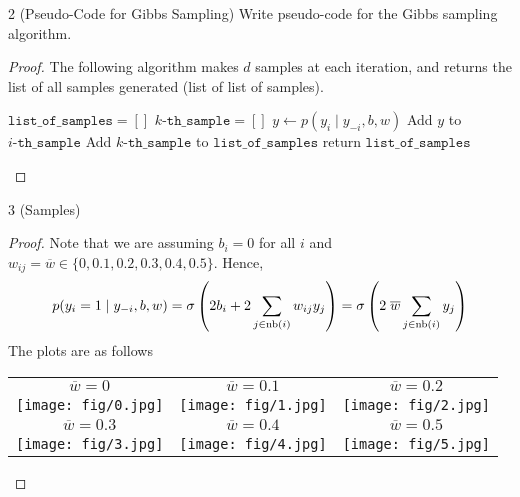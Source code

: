\documentclass[12pt]{article}
\begin{document}
\begin{problem}{2 (Pseudo-Code for Gibbs Sampling)} Write pseudo-code for the Gibbs sampling algorithm.
\end{problem}

\begin{proof} The following algorithm makes $d$ samples at each iteration, and returns the list of all samples generated (list of list of samples).  
\begin{algorithm}[htp!]
\SetAlgoLined
{}
$\texttt{list\_of\_samples} = []$\;
{
    $k\texttt{-th\_sample} = []$\;
    {
        $y \leftarrow p(y_i \mid y_{-i}, b, w)$\;
        Add $y$ to $i\texttt{-th\_sample}$\;
    }
    Add $k  \texttt{-th\_sample}$ to $\texttt{list\_of\_samples}$\;
}
{
    return $\texttt{list\_of\_samples}$\;
}
\caption{$\texttt{Gibbs\_Sampling}$($\texttt{num\_iterations}, b, w$)}
\label{alg:gibbssampling}
\end{algorithm}
\end{proof}

\newpage

\begin{problem}{3 (Samples)}

\end{problem}

\begin{proof}
Note that we are assuming $b_i = 0$ for all $i$ and $w_{ij} = \overline{w} \in \{ 0, 0.1, 0.2, 0.3, 0.4, 0.5 \}$. Hence,
\begin{align}
    p(y_i=1 \mid y_{-i}, b, w) = \sigma\left( 2b_i + 2 \sum_{j \in \mathrm{nb}(i)} w_{ij} y_j \right) = \sigma\left(2 \; \overline{w} \sum_{j \in \mathrm{nb}(i)} y_j\right)
    \label{eq:problem3}
\end{align}
The plots are as follows
\newcommand{\wzero}{\texttt{[image: fig/0.jpg]}}
\newcommand{\wone}{\texttt{[image: fig/1.jpg]}}
\newcommand{\wtwo}{\texttt{[image: fig/2.jpg]}}
\newcommand{\wthree}{\texttt{[image: fig/3.jpg]}}
\newcommand{\wfour}{\texttt{[image: fig/4.jpg]}}
\newcommand{\wfive}{\texttt{[image: fig/5.jpg]}}

\begin{table}[!ht]
    \centering
    \begin{tabular}{|c|c|c|}
        \hline
        $\overline{w} = 0$ & $\overline{w} = 0.1$ & $\overline{w} = 0.2$ \\
        \wzero & \wone & \wtwo  \\
        \hline 
        $\overline{w} = 0.3$ & $\overline{w} = 0.4$ & $\overline{w} = 0.5$ \\
        \wthree & \wfour & \wfive \\
        \hline
    \end{tabular}
\end{table}
\end{proof}
\end{document}
